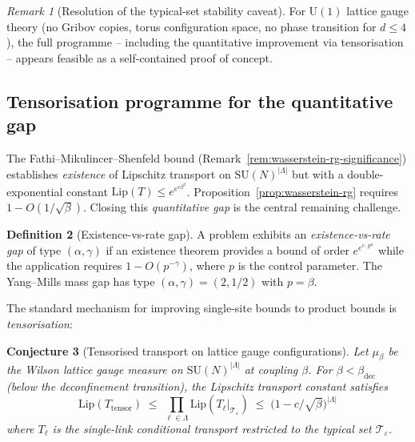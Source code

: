 \documentclass[12pt,a4paper]{article}
\theoremstyle{definition}
\newtheorem{definition}{Definition}[section]
\theoremstyle{plain}
\newtheorem{conjecture}[definition]{Conjecture}
\theoremstyle{remark}
\newtheorem{remark}[definition]{Remark}
\begin{document}
\begin{remark}[Resolution of the typical-set stability caveat]
For $\mathrm{U}(1)$ lattice gauge theory (no Gribov copies, torus
configuration space, no phase transition for $d \leq 4$),
the full programme -- including the quantitative improvement via
tensorisation -- appears feasible as a self-contained proof of concept.
\end{remark}

\subsection{Tensorisation programme for the quantitative gap}\label{sec:tensorisation}

The Fathi--Mikulincer--Shenfeld bound (Remark~\ref{rem:wasserstein-rg-significance})
establishes \emph{existence} of Lipschitz transport on $\mathrm{SU}(N)^{|\Lambda|}$
but with a double-exponential constant $\mathrm{Lip}(T) \leq e^{e^{c\beta^2}}$.
Proposition~\ref{prop:wasserstein-rg} requires $1 - O(1/\sqrt{\beta})$.
Closing this \emph{quantitative gap} is the central remaining challenge.

\begin{definition}[Existence-vs-rate gap]\label{def:evr-gap}
A problem exhibits an \emph{existence-vs-rate gap} of type $(\alpha, \gamma)$
if an existence theorem provides a bound of order $e^{e^{c \cdot p^\alpha}}$
while the application requires $1 - O(p^{-\gamma})$,
where $p$ is the control parameter.
The Yang--Mills mass gap has type $(\alpha, \gamma) = (2, 1/2)$
with $p = \beta$.
\end{definition}

The standard mechanism for improving single-site bounds to product bounds
is \emph{tensorisation}:

\begin{conjecture}[Tensorised transport on lattice gauge configurations]
\label{conj:tensorisation}
Let $\mu_\beta$ be the Wilson lattice gauge measure on
$\mathrm{SU}(N)^{|\Lambda|}$ at coupling $\beta$.
For $\beta < \beta_{\mathrm{dec}}$ (below the deconfinement transition),
the Lipschitz transport constant satisfies
\[
  \mathrm{Lip}(T_{\mathrm{tensor}}) \;\leq\;
  \prod_{\ell \in \Lambda} \mathrm{Lip}(T_\ell|_{\mathcal{T}_\varepsilon})
  \;\leq\; \bigl(1 - c/\sqrt{\beta}\bigr)^{|\Lambda|}
\]
where $T_\ell$ is the single-link conditional transport
restricted to the typical set $\mathcal{T}_\varepsilon$.
\end{conjecture}
\end{document}
